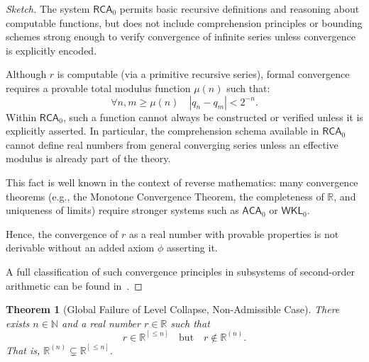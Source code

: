 \documentclass[12pt]{article}
\theoremstyle{definition}
\theoremstyle{plain}
\newtheorem{theorem}[definition]{Theorem}
\theoremstyle{remark}
\begin{document}
\begin{proof}[Sketch]
The system \( \mathsf{RCA}_0 \) permits basic recursive definitions and reasoning about computable functions, but does not include comprehension principles or bounding schemes strong enough to verify convergence of infinite series unless convergence is explicitly encoded.

Although \( r \) is computable (via a primitive recursive series), formal convergence requires a provable total modulus function \( \mu(n) \) such that:
\[
    \forall n, m \geq \mu(n) \quad |q_n - q_m| < 2^{-n}.
\]
Within \( \mathsf{RCA}_0 \), such a function cannot always be constructed or verified unless it is explicitly asserted. In particular, the comprehension schema available in \( \mathsf{RCA}_0 \) cannot define real numbers from general converging series unless an effective modulus is already part of the theory.

This fact is well known in the context of reverse mathematics: many convergence theorems (e.g., the Monotone Convergence Theorem, the completeness of \( \mathbb{R} \), and uniqueness of limits) require stronger systems such as \( \mathsf{ACA}_0 \) or \( \mathsf{WKL}_0 \).

Hence, the convergence of \( r \) as a real number with provable properties is not derivable without an added axiom \( \phi \) asserting it.

A full classification of such convergence principles in subsystems of second-order arithmetic can be found in~\cite{Simpson2009Subsystems}.
\end{proof}

\begin{theorem}[Global Failure of Level Collapse, Non-Admissible Case]
\label{thm:noncollapse}
There exists \( n \in \mathbb{N} \) and a real number \( r \in \mathbb{R} \) such that
\[
    r \in \mathbb{R}^{[\leq n]} \quad \text{but} \quad r \notin \mathbb{R}^{(n)}.
\]
That is, \( \mathbb{R}^{(n)} \subsetneq \mathbb{R}^{[\leq n]} \).
\end{theorem}
\end{document}
